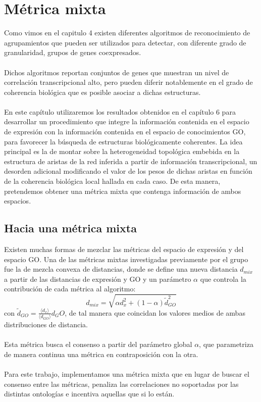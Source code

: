 \chapter{Métrica mixta}
Como vimos en el capitulo 4 existen diferentes algoritmos de reconocimiento de agrupamientos que pueden ser utilizados para detectar, con diferente grado de granularidad, grupos de genes coexpresados.\\\\
Dichos algoritmos reportan conjuntos de genes que muestran un nivel de correlación transcripcional alto, pero pueden diferir notablemente en el grado de coherencia biológica que es posible asociar a dichas estructuras.\\\\
En este capítulo utilizaremos los resultados obtenidos en el capítulo 6 para desarrollar un procedimiento que integre la información contenida en el espacio de expresión con la información contenida en el espacio de conocimientos GO, para favorecer la búsqueda de estructuras biológicamente coherentes. La idea principal es la de montar sobre la heterogeneidad topológica embebida en la estructura de aristas de la red inferida a partir de información transcripcional, un desorden adicional modificando el valor de los pesos de dichas aristas en función de la coherencia biológica local hallada en cada caso. De esta manera, pretendemos obtener una métrica mixta que contenga información de ambos espacios.

\section{Hacia una métrica mixta}
Existen muchas formas de mezclar las métricas del espacio de expresión y del espacio GO. Una de las métricas mixtas investigadas previamente por el grupo \cite{Berenstein2010} fue la de mezcla convexa de distancias, donde se define una nueva distancia $d_{mix}$ a partir de las distancias de expresión y GO y un parámetro $\alpha$ que controla la contribución de cada métrica al algoritmo:
\begin{equation}
	d_{mix} = \sqrt{\alpha d_{x}^2 + (1-\alpha)\tilde{d}_{GO}^2}
\end{equation}
con $\tilde{d}_{GO} = \frac{\langle d_x \rangle}{\langle d_{GO} \rangle}d{_GO}$, de tal manera que coincidan los valores medios de ambas distribuciones de distancia.\\\\
Esta métrica busca el consenso a partir del parámetro global $\alpha$, que parametriza de manera continua una métrica en contraposición con la otra.\\\\
Para este trabajo, implementamos una métrica mixta que en lugar de buscar el consenso entre las métricas, penaliza las correlaciones no soportadas por las distintas ontologías e incentiva aquellas que si lo están.
